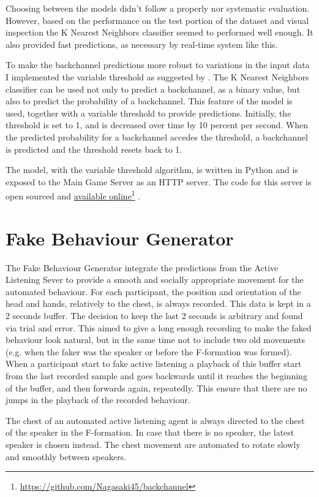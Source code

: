\documentclass[]{simple-thesis}
\newcommand\fnurl[2]{%
  \href{#2}{#1}\footnote{\url{#2}}%
}
\begin{document}
Choosing between the models didn't follow a properly nor systematic evaluation.
However, based on the performance on the test portion of the dataset and visual inspection the K Nearest Neighbors classifier seemed to performed well enough.
It also provided fast predictions, as necessary by real-time system like this.

To make the backchannel predictions more robust to variations in the input data I implemented the variable threshold as suggested by \cite{Kok2012}.
The K Nearest Neighbors classifier can be used not only to predict a backchannel, as a binary value, but also to predict the probability of a backchannel.
This feature of the model is used, together with a variable threshold to provide predictions.
Initially, the threshold is set to 1, and is decreased over time by 10 percent per second.
When the predicted probability for a backchannel accedes the threshold, a backchannel is predicted and the threshold resets back to 1.

The model, with the variable threshold algorithm, is written in Python and is exposed to the Main Game Server as an HTTP server.
The code for this server is open sourced and \fnurl{available online}{https://github.com/Nagasaki45/backchannel}.

\section{Fake Behaviour Generator}\label{system:fake_behaviour_generator}

The Fake Behaviour Generator integrate the predictions from the Active Listening Sever to provide a smooth and socially appropriate movement for the automated behaviour.
For each participant, the position and orientation of the head and hands, relatively to the chest, is always recorded.
This data is kept in a 2 seconds buffer.
The decision to keep the last 2 seconds is arbitrary and found via trial and error.
This aimed to give a long enough recording to make the faked behaviour look natural, but in the same time not to include two old movements (e.g. when the faker was the speaker or before the F-formation was formed).
When a participant start to fake active listening a playback of this buffer start from the last recorded sample and goes backwards until it reaches the beginning of the buffer, and then forwards again, repeatedly.
This ensure that there are no jumps in the playback of the recorded behaviour.

The chest of an automated active listening agent is always directed to the chest of the speaker in the F-formation.
In case that there is no speaker, the latest speaker is chosen instead.
The chest movement are automated to rotate slowly and smoothly between speakers.
\end{document}
